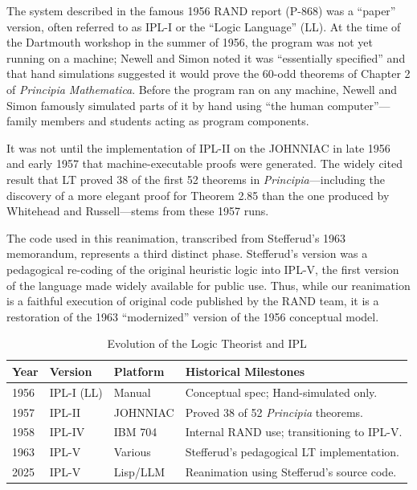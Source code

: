 \documentclass[journal]{IEEEtran}
\begin{document}
The system described in the famous 1956 RAND report (P-868) was a
``paper'' version, often referred to as IPL-I or the ``Logic
Language'' (LL).  At the time of the Dartmouth workshop in the summer
of 1956, the program was not yet running on a machine; Newell and
Simon noted it was ``essentially specified'' and that hand simulations
suggested it would prove the 60-odd theorems of Chapter 2 of
\textit{Principia Mathematica}.  Before the program ran on any
machine, Newell and Simon famously simulated parts of it by hand using
``the human computer''—family members and students acting as program
components.

It was not until the implementation of IPL-II on the JOHNNIAC in late
1956 and early 1957\cite{gruenberger1968johnniac} that
machine-executable proofs were generated.  The widely cited result
that LT proved 38 of the first 52 theorems in
\textit{Principia}—including the discovery of a more elegant proof for
Theorem 2.85 than the one produced by Whitehead and Russell—stems from
these 1957 runs.

The code used in this reanimation, transcribed from Stefferud's 1963
memorandum, represents a third distinct phase.  Stefferud's version
was a pedagogical re-coding of the original heuristic logic into
IPL-V, the first version of the language made widely available for
public use.  Thus, while our reanimation is a faithful execution of
original code published by the RAND team, it is a restoration of
the 1963 ``modernized'' version of the 1956 conceptual model.

\begin{table}[h]
\centering
\caption{Evolution of the Logic Theorist and IPL}
\label{tab:lt_versions}
\begin{tabular}{@{}llll@{}}
\toprule
\textbf{Year} & \textbf{Version} & \textbf{Platform} & \textbf{Historical Milestones} \\ \midrule
1956 & IPL-I (LL) & Manual & Conceptual spec; Hand-simulated only. \\
1957 & IPL-II & JOHNNIAC & Proved 38 of 52 \textit{Principia} theorems. \\
1958 & IPL-IV & IBM 704 & Internal RAND use; transitioning to IPL-V. \\
1963 & IPL-V & Various & Stefferud's pedagogical LT implementation. \\
2025 & IPL-V & Lisp/LLM & Reanimation using Stefferud's source code. \\ \bottomrule
\end{tabular}
\end{table}
\end{document}
